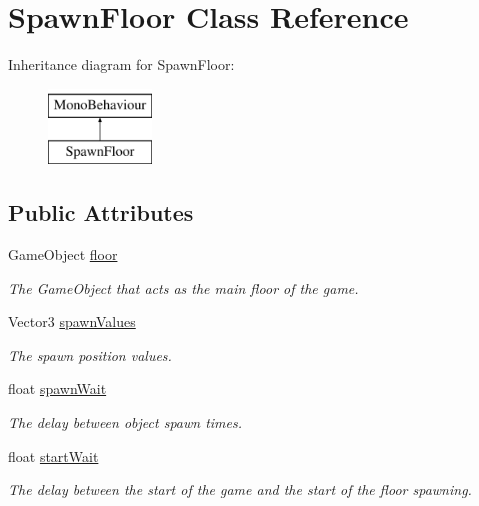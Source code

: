 \hypertarget{classSpawnFloor}{\section{Spawn\-Floor Class Reference}
\label{classSpawnFloor}
}
Inheritance diagram for Spawn\-Floor\-:\begin{figure}[H]
\begin{center}
\leavevmode
\includegraphics[height=2.000000cm]{classSpawnFloor}
\end{center}
\end{figure}
\subsection*{Public Attributes}
\begin{DoxyCompactItemize}
\item 
Game\-Object \hyperlink{classSpawnFloor_a5c0ce5e6b89553960340b1a108ef49d6}{floor}
\begin{DoxyCompactList}\small\item\em The Game\-Object that acts as the main floor of the game. \end{DoxyCompactList}\item 
Vector3 \hyperlink{classSpawnFloor_ade77f9840ef3b18a4f2fb12ef8f16b61}{spawn\-Values}
\begin{DoxyCompactList}\small\item\em The spawn position values. \end{DoxyCompactList}\item 
float \hyperlink{classSpawnFloor_abbc700e5d578b3317400424919914a71}{spawn\-Wait}
\begin{DoxyCompactList}\small\item\em The delay between object spawn times. \end{DoxyCompactList}\item 
float \hyperlink{classSpawnFloor_a3ed022cb29f19385586cbb4eccfca523}{start\-Wait}
\begin{DoxyCompactList}\small\item\em The delay between the start of the game and the start of the floor spawning. \end{DoxyCompactList}\end{DoxyCompactItemize}


